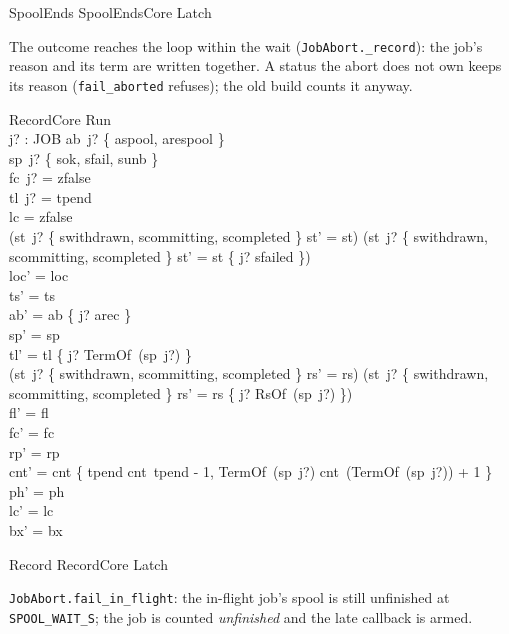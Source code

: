 \documentclass[a4paper,10pt,fleqn]{article}
\newcommand{\field}[1]{\texttt{#1}}
\begin{document}
\begin{zed}
SpoolEnds  SpoolEndsCore \land Latch
\end{zed}

The outcome reaches the loop within the wait (\field{JobAbort.\_record}): the
job's reason and its term are written together. A status the abort does not own
keeps its reason (\field{fail\_aborted} refuses); the old build counts it
anyway.

\begin{schema}{RecordCore}
\Delta Run \\ j? : JOB
\where
ab~j? \in \{ aspool, arespool \} \\
sp~j? \in \{ sok, sfail, sunb \} \\
fc~j? = zfalse \\
tl~j? = tpend \\
lc = zfalse \\
(st~j? \in \{ swithdrawn, scommitting, scompleted \} \implies st' = st) \land (st~j? \notin \{ swithdrawn, scommitting, scompleted \} \implies st' = st \oplus \{ j? \mapsto sfailed \}) \\
loc' = loc \\
ts' = ts \\
ab' = ab \oplus \{ j? \mapsto arec \} \\
sp' = sp \\
tl' = tl \oplus \{ j? \mapsto TermOf~(sp~j?) \} \\
(st~j? \in \{ swithdrawn, scommitting, scompleted \} \implies rs' = rs) \land (st~j? \notin \{ swithdrawn, scommitting, scompleted \} \implies rs' = rs \oplus \{ j? \mapsto RsOf~(sp~j?) \}) \\
fl' = fl \\
fc' = fc \\
rp' = rp \\
cnt' = cnt \oplus \{ tpend \mapsto cnt~tpend - 1, TermOf~(sp~j?) \mapsto cnt~(TermOf~(sp~j?)) + 1 \} \\
ph' = ph \\
lc' = lc \\
bx' = bx
\end{schema}

\begin{zed}
Record  RecordCore \land Latch
\end{zed}

\field{JobAbort.fail\_in\_flight}: the in-flight job's spool is still unfinished
at \field{SPOOL\_WAIT\_S}; the job is counted \emph{unfinished} and the late
callback is armed.
\end{document}
